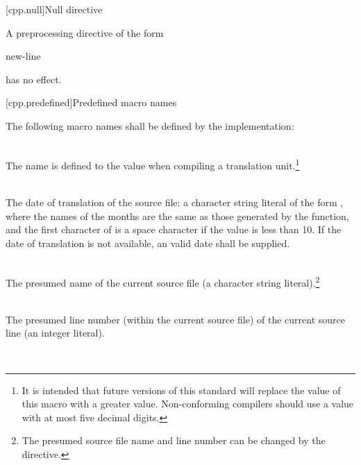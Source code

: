 [cpp.null]{Null directive}%

\pnum
A preprocessing directive of the form

\begin{ncsimplebnf}
\terminal{\#} new-line
\end{ncsimplebnf}

has no effect.

[cpp.predefined]{Predefined macro names}
%

\pnum
The following macro names shall be defined by the implementation:

\begin{description}

%
\item {}\\
The name  is defined
to the value
\tcode{\cppver}
when
compiling a \Cpp translation unit.\footnote{It is intended that future
versions of this standard will
replace the value of this macro with a greater value.
Non-conforming compilers should use a value with at most
five decimal digits.}

%
\item {}\\
The date of translation of the source file:
a character string literal of the form
,
where the names of the months are the same as those generated
by the
function,
and the first character of
is a space character if the value is less than 10.
If the date of translation is not available,
an  valid date
shall be supplied.

%
\item {}\\
The presumed name of the current source file (a character string
literal).\footnote{The presumed source file name and line number can be changed
by the  directive.}

%
\item {}\\
The presumed line number (within the current source file) of the current source line
(an integer literal).%
\addtocounter{footnote}{-1}\footnotemark\


\end{description}
